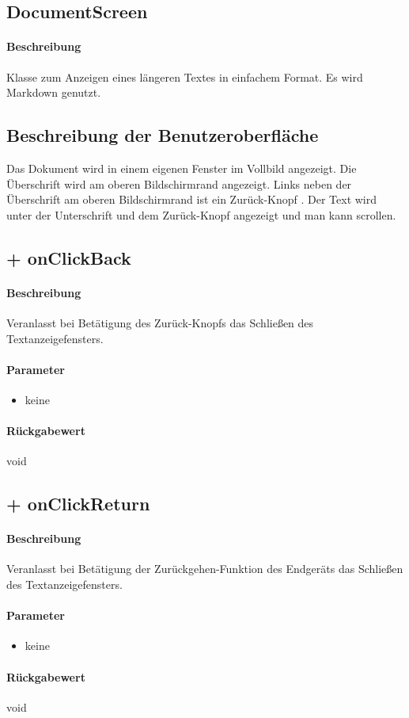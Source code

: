 \subsection{DocumentScreen}
\paragraph*{Beschreibung}
Klasse zum Anzeigen eines längeren Textes in einfachem Format. 
Es wird Markdown genutzt.

\subsection{Beschreibung der Benutzeroberfläche}
Das Dokument wird in einem eigenen Fenster im Vollbild angezeigt.
Die Überschrift wird am oberen Bildschirmrand angezeigt.
Links neben der Überschrift am oberen Bildschirmrand ist ein \dq Zurück-Knopf \dq{}.
Der Text wird unter der Unterschrift und dem \dq Zurück-Knopf \dq{} angezeigt und man kann scrollen.

\subsection{+ onClickBack}%
\paragraph*{Beschreibung}
Veranlasst bei Betätigung des \dq Zurück-Knopfs \dq{} das Schließen des Textanzeigefensters.
\paragraph*{Parameter}
\begin{itemize}
    \item keine
\end{itemize}
\paragraph*{Rückgabewert}
void

\subsection{+ onClickReturn}%
\paragraph*{Beschreibung}
Veranlasst bei Betätigung der Zurückgehen-Funktion des Endgeräts das Schließen des Textanzeigefensters.
\paragraph*{Parameter}
\begin{itemize}
    \item keine
\end{itemize}
\paragraph*{Rückgabewert}
void
